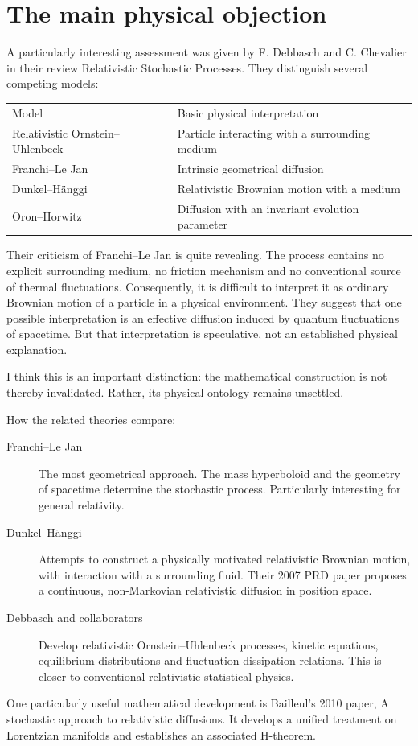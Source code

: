 \section{The main physical objection}
A particularly interesting assessment was given by F. Debbasch and C. Chevalier in their review Relativistic Stochastic Processes.
They distinguish several competing models:
\begin{table}[h]
    \begin{tabular}{p{}p{}}
        Model&	Basic physical interpretation\\
        Relativistic Ornstein–Uhlenbeck	&Particle interacting with a surrounding medium\\
        Franchi–Le Jan &	Intrinsic geometrical diffusion\\
        Dunkel–Hänggi &	Relativistic Brownian motion with a medium\\
        Oron–Horwitz &	Diffusion with an invariant evolution parameter\\
    \end{tabular}
\end{table}
Their criticism of Franchi–Le Jan is quite revealing.
The process contains no explicit surrounding medium, no friction mechanism and no conventional source of thermal fluctuations.
Consequently, it is difficult to interpret it as ordinary Brownian motion of a particle in a physical environment.
They suggest that one possible interpretation is an effective diffusion induced by quantum fluctuations of spacetime. But that interpretation is speculative, not an established physical explanation. 

I think this is an important distinction: the mathematical construction is not thereby invalidated. Rather, its physical ontology remains unsettled.

How the related theories compare:
\begin{description}
    \item [Franchi–Le Jan] The most geometrical approach. The mass hyperboloid and the geometry of spacetime determine the stochastic process. Particularly interesting for general relativity.
    \item [Dunkel–Hänggi] Attempts to construct a physically motivated relativistic Brownian motion, with interaction with a surrounding fluid. Their 2007 PRD paper proposes a continuous, non-Markovian relativistic diffusion in position space.
    \item [Debbasch and collaborators] Develop relativistic Ornstein–Uhlenbeck processes, kinetic equations, equilibrium distributions and fluctuation-dissipation relations. This is closer to conventional relativistic statistical physics.
\end{description}
One particularly useful mathematical development is Bailleul's 2010 paper, A stochastic approach to relativistic diffusions. It develops a unified treatment on Lorentzian manifolds and establishes an associated H-theorem. 

